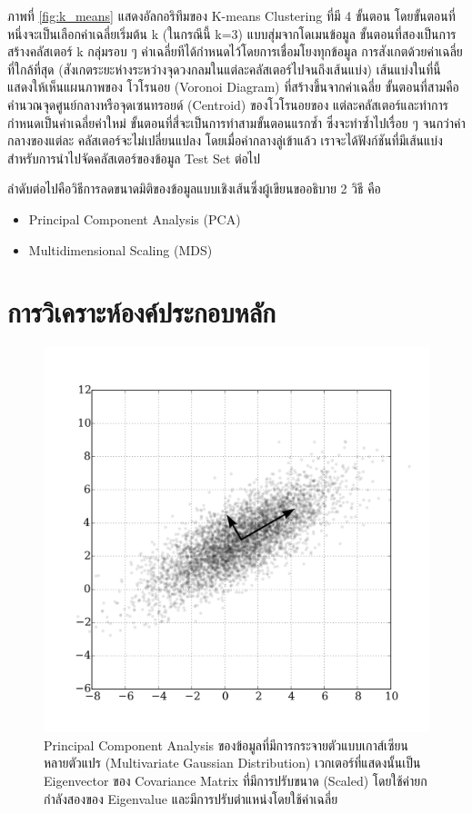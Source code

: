 ภาพที่ \ref{fig:k_means} แสดงอัลกอริทึมของ K-means Clustering ที่มี 4 ขั้นตอน โดยขั้นตอนที่หนึ่งจะเป็นเลือกค่าเฉลี่ยเริ่มต้น k 
(ในกรณีนี้ k=3) แบบสุ่มจากโดเมนข้อมูล ขั้นตอนที่สองเป็นการสร้างคลัสเตอร์ k กลุ่มรอบ ๆ ค่าเฉลี่ยทีได้กำหนดไว้โดยการเชื่อมโยงทุกข้อมูล%
การสังเกตด้วยค่าเฉลี่ยที่ใกล้ที่สุด (สังเกตระยะห่างระหว่างจุดวงกลมในแต่ละคลัสเตอร์ไปจนถึงเส้นแบ่ง) เส้นแบ่งในที่นี้แสดงให้เห็นแผนภาพของ%
โวโรนอย (Voronoi Diagram) ที่สร้างขึ้นจากค่าเฉลี่ย ขั้นตอนที่สามคือคำนวณจุดศูนย์กลางหรือจุดเซนทรอยด์ (Centroid) ของโวโรนอยของ%
แต่ละคลัสเตอร์และทำการกำหนดเป็นค่าเฉลี่ยค่าใหม่ ขั้นตอนที่สี่จะเป็นการทำสามขั้นตอนแรกซ้ำ ซึ่งจะทำซ้ำไปเรื่อย ๆ จนกว่าค่ากลางของแต่ละ%
คลัสเตอร์จะไม่เปลี่ยนแปลง โดยเมื่อค่ากลางลู่เข้าแล้ว เราจะได้ฟังก์ชันที่มีเส้นแบ่งสำหรับการนำไปจัดคลัสเตอร์ของข้อมูล Test Set ต่อไป

ลำดับต่อไปคือวิธีการลดขนาดมิติของข้อมูลแบบเชิงเส้นซึ่งผู้เขียนขออธิบาย 2 วิธี คือ

\begin{itemize}[topsep=0pt]
    \item Principal Component Analysis (PCA)
    
    \item Multidimensional Scaling (MDS)
\end{itemize}

\section{การวิเคราะห์องค์ประกอบหลัก}
\label{sec:pca}

\begin{figure}[htbp]
    \centering
    \includegraphics[width=0.8\linewidth]{fig/pca.png}
    \caption{Principal Component Analysis ของข้อมูลที่มีการกระจายตัวแบบเกาส์เซียนหลายตัวแปร (Multivariate Gaussian
    Distribution) เวกเตอร์ที่แสดงนั้นเป็น Eigenvector ของ Covariance Matrix ที่มีการปรับขนาด (Scaled) โดยใช้ค่ายกกำลังสองของ 
    Eigenvalue และมีการปรับตำแหน่งโดยใช้ค่าเฉลี่ย}
    \label{fig:pca}
\end{figure}

